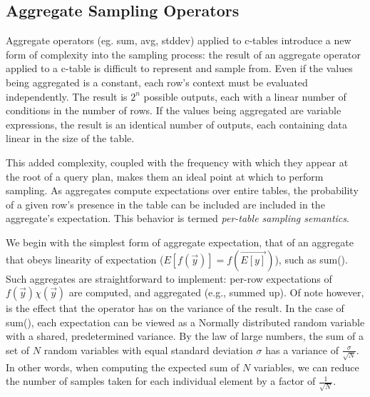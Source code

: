 %


\subsection{Aggregate Sampling Operators}
Aggregate operators (eg. sum, avg, stddev) applied to c-tables introduce a new form of complexity into the sampling process: the result of an aggregate operator applied to a c-table is difficult to represent and sample from.  Even if the values being aggregated is a constant, each row's context must be evaluated independently.  The result is $2^n$ possible outputs, each with a linear number of conditions in the number of rows.  If the values being aggregated are variable expressions, the result is an identical number of outputs, each containing data linear in the size of the table.  

This added complexity, coupled with the frequency with which they appear at the root of a query plan, makes them an ideal point at which to perform sampling.  As aggregates compute expectations over entire tables, the probability of a given row's presence in the table can be included are included in the aggregate's expectation.  This behavior is termed \textit{per-table sampling semantics}.

We begin with the simplest form of aggregate expectation, that of an aggregate that obeys linearity of expectation ($E[f(\vec{y})] = f(\vec{E[y]})$), such as sum().  Such aggregates are straightforward to implement: per-row expectations of $f(\vec y)\chi(\vec y)$ are computed, and aggregated (e.g., summed up).  Of note however, is the effect that the operator has on the variance of the result.  In the case of sum(), each expectation can be viewed as a Normally distributed random variable with a shared, predetermined variance.  By the law of large numbers, the sum of a set of $N$ random variables with equal standard deviation $\sigma$ has a variance of $\frac{\sigma}{\sqrt{N}}$.  In other words, when computing the expected sum of $N$ variables, we can reduce the number of samples taken for each individual element by a factor of $\frac{1}{\sqrt{N}}$.


